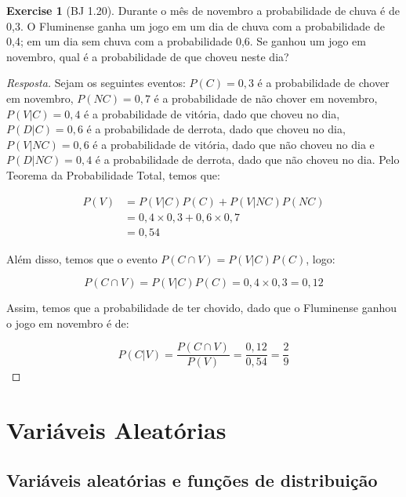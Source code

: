 \documentclass[
]{article}
\theoremstyle{definition}
\theoremstyle{definition}
\theoremstyle{definition}
\newtheorem{exercise}{Exercise}[section]
\theoremstyle{definition}
\theoremstyle{remark}
\begin{document}
\begin{exercise}[BJ 1.20]

Durante o mês de novembro a probabilidade de chuva é de 0,3. O Fluminense ganha um jogo em um dia de chuva com a probabilidade de 0,4; em um dia sem chuva com a probabilidade 0,6. Se ganhou um jogo em novembro, qual é a probabilidade de que choveu neste dia?

\begin{proof}[Resposta]
Sejam os seguintes eventos: \(P(C) = 0,3\) é a probabilidade de chover em novembro, \(P(NC) = 0,7\) é a probabilidade de não chover em novembro, \(P(V|C) = 0,4\) é a probabilidade de vitória, dado que choveu no dia, \(P(D|C) = 0,6\) é a probabilidade de derrota, dado que choveu no dia, \(P(V|NC) = 0,6\) é a probabilidade de vitória, dado que não choveu no dia e \(P(D|NC) = 0,4\) é a probabilidade de derrota, dado que não choveu no dia. Pelo Teorema da Probabilidade Total, temos que:

\begin{align*}
P(V) &= P(V|C)P(C) + P(V|NC)P(NC) \\
&= 0,4 \times 0,3 + 0,6 \times 0,7 \\
&= 0,54
\end{align*}

Além disso, temos que o evento \(P(C \cap V) = P(V|C)P(C)\), logo:

\begin{equation*}
P(C \cap V) = P(V|C)P(C) = 0,4 \times 0,3 = 0,12
\end{equation*}

Assim, temos que a probabilidade de ter chovido, dado que o Fluminense ganhou o jogo em novembro é de:

\begin{equation*}
P(C|V) = \frac{P(C \cap V)}{P(V)} = \frac{0,12}{0,54} = \frac{2}{9}
\end{equation*}
\end{proof}

\end{exercise}

\newpage

\hypertarget{variuxe1veis-aleatuxf3rias}{%
\section{Variáveis Aleatórias}\label{variuxe1veis-aleatuxf3rias}}

\hypertarget{variuxe1veis-aleatuxf3rias-e-funuxe7uxf5es-de-distribuiuxe7uxe3o}{%
\subsection{Variáveis aleatórias e funções de distribuição}\label{variuxe1veis-aleatuxf3rias-e-funuxe7uxf5es-de-distribuiuxe7uxe3o}}
\end{document}
